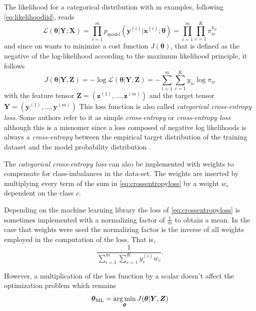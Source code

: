 The likelihood for a categorical distribution with m examples, following \cref{eq:likelihoodiid}, reads
\begin{equation}
    \mathcal{L}(\bm{\theta}|\bm{Y}; \bm{X}) = \prod_{i=1}^{m} p_{\text{model}}(\bm{y}^{(i)}|\bm{x}^{(i)}; \bm{\theta}) = \prod_{i=1}^{m} \prod_{c=1}^K \pi_{ic}^{y_{ic}}
\end{equation}
and since on wants to minimize a cost function $J(\bm{\theta})$, that is defined as the negative of the log-likelihood according to the maximum likelihood principle, it follows
\begin{equation} \label{eq:crossentropyloss}
    J(\bm{\theta}|\bm{Y}, {\bm{Z}}) = - \log \mathcal{L}(\bm{\theta}|\bm{Y}, {\bm{Z}}) = - \sum_{i=1}^m \sum_{c=1}^K y_{ic} \log \pi_{ic}
\end{equation}
with the feature tensor $\bm{Z} = (\bm{z}^{(1)}, ..., \bm{z}^{(m)})$ and the target tensor $\bm{Y} = (\bm{y}^{(1)}, ..., \bm{y}^{(m)})$
This loss function is also called \textit{categorical cross-entropy loss}. Some authors refer to it as simple \textit{cross-entropy} or \textit{cross-entropy loss} although this is a misnomer since a loss composed of negative log likelihoods is always a \textit{cross-entropy} between the empirical target distribution of the training dataset and the model probability distribution \citep{Goodfellow2016}. 

The \textit{categorical cross-entropy loss} can also be implemented with weights to compensate for class-imbalances in the data-set. The weights are inserted by multiplying every term of the sum in \cref{eq:crossentropyloss} by a weight $w_c$ dependent on the class $c$. 

Depending on the machine learning library the loss of \cref{eq:crossentropyloss} is sometimes implemented with a normalizing factor of $\frac{1}{m}$ to obtain a mean. In the case that weights were used the normalizing factor is the inverse of all weights employed in the computation of the loss. That is,
\begin{equation}
    \dfrac{1}{\sum_{i=1}^{m} \sum_{c=1}^K y_c^{(i)} w_c}.
\end{equation}

However, a multiplication of the loss function by a scalar doesn't affect the optimization problem which remains
\begin{equation} \label{eq:mlpcostfunction}
    \bm{\theta}_{\text{ML}} = \operatorname*{\arg\min}_{\bm{\theta}} J(\bm{\theta}|\bm{Y}, {\bm{Z}})
\end{equation}

